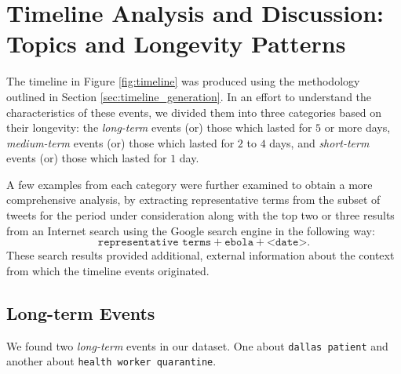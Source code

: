 \section{Timeline Analysis and Discussion:  Topics and Longevity Patterns}
\label{sec:timeline}
The timeline in Figure \ref{fig:timeline} was produced using the methodology
outlined in Section \ref{sec:timeline_generation}.  
In an effort to understand the characteristics of these
events, we divided them into three categories based on their longevity: the \emph{long-term} events (or) those
which lasted for $5$ or more days, \emph{medium-term} events (or) those which lasted
for $2$ to $4$ days, and \emph{short-term} events (or) those which lasted for $1$ day.

A few examples from each category were further examined to obtain a more 
comprehensive analysis, by extracting representative terms from the 
subset of tweets for the period under consideration along with the 
top two or three results from an Internet search using the 
Google search engine in the following way: 
\[
\texttt{representative terms} + \texttt{ebola} + \texttt{<date>}.
\]
These search results provided additional, external information about the context from which the timeline events originated.

\subsection{Long-term Events}
We found two \emph{long-term} events in our dataset.  One about \texttt{dallas patient}
and another about \texttt{health worker quarantine}.

